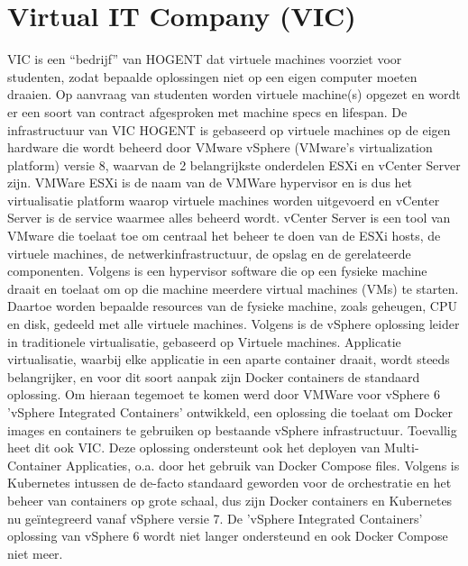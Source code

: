 \section{Virtual IT Company (VIC)}
VIC is een ``bedrijf'' van HOGENT dat virtuele machines voorziet voor studenten, zodat bepaalde oplossingen niet op een eigen computer moeten draaien. Op aanvraag van studenten worden virtuele machine(s) opgezet en wordt er een soort van contract afgesproken met machine specs en lifespan.
\newline
\newline
De infrastructuur van VIC HOGENT is gebaseerd op virtuele machines op de eigen hardware die wordt beheerd door VMware vSphere (VMware's virtualization platform) versie 8, waarvan de 2 belangrijkste onderdelen ESXi en vCenter Server zijn.
\newline
VMWare ESXi is de naam van de VMWare hypervisor en is dus het virtualisatie platform waarop virtuele machines worden uitgevoerd en vCenter Server is de service waarmee alles beheerd wordt.
\newline
vCenter Server is een tool van VMware die toelaat toe om centraal het beheer te doen van de ESXi hosts, de virtuele machines, de netwerkinfrastructuur, de opslag en de gerelateerde componenten.
\newline
Volgens \textcite{VMware2023a} is een hypervisor software die op een fysieke machine draait en toelaat om op die machine meerdere virtual machines (VMs) te starten. Daartoe worden bepaalde resources van de fysieke machine, zoals geheugen, CPU en disk, gedeeld met alle virtuele machines.
\newline
Volgens \textcite{VMware2023b} is de vSphere oplossing leider in traditionele virtualisatie, gebaseerd op Virtuele machines.
\newline
Applicatie virtualisatie, waarbij elke applicatie in een aparte container draait, wordt steeds belangrijker, en voor dit soort aanpak zijn Docker containers de standaard oplossing. Om hieraan tegemoet te komen werd door VMWare voor vSphere 6 'vSphere Integrated Containers' ontwikkeld, een oplossing die toelaat om Docker images en containers te gebruiken op bestaande vSphere infrastructuur. Toevallig heet dit ook VIC.\autocite{VMware2023b}
Deze oplossing ondersteunt ook het deployen van Multi-Container Applicaties, o.a. door het gebruik van Docker Compose files.
\newline
\newline
Volgens \textcite{VMware2021} is Kubernetes intussen de de-facto standaard geworden voor de orchestratie en het beheer van containers op grote schaal, dus zijn Docker containers en Kubernetes nu geïntegreerd vanaf vSphere versie 7. De 'vSphere Integrated Containers' oplossing van vSphere 6 wordt niet langer ondersteund en ook Docker Compose niet meer.
